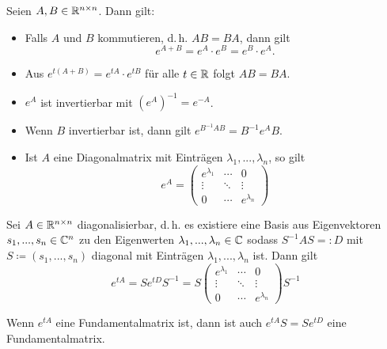 \documentclass{cheat-sheet}
\begin{document}
\begin{satz}
  Seien $A, B \in \mathbb{R}^{n \times n}$. Dann gilt:
  \begin{itemize}
    \item Falls $A$ und $B$ kommutieren, d.\,h. $AB = BA$, dann gilt
    \[ e^{A+B} = e^A \cdot e^B = e^B \cdot e^A. \]
    \item Aus $e^{t(A + B)} = e^{tA} \cdot e^{tB}$ für alle $t \in \mathbb{R}$ folgt $AB = BA$.
    \item $e^{A}$ ist invertierbar mit $(e^A)^{-1} = e^{-A}$.
    \item Wenn $B$ invertierbar ist, dann gilt $e^{B^{-1}AB} = B^{-1} e^A B$.
    \item Ist $A$ eine Diagonalmatrix mit Einträgen $\lambda_1, ..., \lambda_n$, so gilt
    \[ e^A = \begin{pmatrix} e^{\lambda_1} & \cdots & 0 \\ \vdots & \ddots & \vdots \\ 0 & \cdots & e^{\lambda_n} \end{pmatrix} \]
  \end{itemize}
\end{satz}

\begin{satz}
  Sei $A \in \mathbb{R}^{n \times n}$ diagonalisierbar, d.\,h. es existiere eine Basis aus Eigenvektoren $s_1, ..., s_n \in \mathbb{C}^n$ zu den Eigenwerten $\lambda_1, ..., \lambda_n \in \mathbb{C}$ sodass $S^{-1} A S =: D$ mit $S \coloneqq (s_1, ..., s_n)$ diagonal mit Einträgen $\lambda_1, ..., \lambda_n$ ist. Dann gilt
  \[ e^{tA} = S e^{tD} S^{-1} = S \begin{pmatrix} e^{\lambda_1} & \cdots & 0 \\ \vdots & \ddots & \vdots \\ 0 & \cdots & e^{\lambda_n} \end{pmatrix} S^{-1} \]
\end{satz}

\begin{bem}
  Wenn $e^{tA}$ eine Fundamentalmatrix ist, dann ist auch $e^{tA} S = S e^{tD}$ eine Fundamentalmatrix.
\end{bem}

\end{document}

